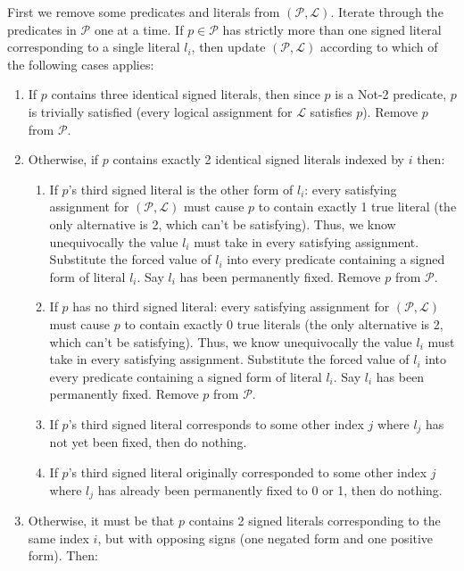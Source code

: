 \documentclass{article}
\begin{document}
First we remove some predicates and literals from $(\mathcal{P}, \mathcal{L})$. Iterate through the predicates in $\mathcal{P}$ one at a time.  If $p\in \mathcal{P}$ has strictly more than one signed literal corresponding to a single literal $l_i$, then update $(\mathcal{P}, \mathcal{L})$ according to which of the following cases applies:
\begin{enumerate}
\item If $p$ contains three identical signed literals, then since $p$ is a Not-2 predicate, $p$ is trivially satisfied (every logical assignment for $\mathcal{L}$ satisfies $p$). Remove $p$ from $\mathcal{P}$.
\item Otherwise, if $p$ contains exactly 2 identical signed literals indexed by $i$ then:
\begin{enumerate}
\item If $p$'s third signed literal is the other form of $l_i$: every satisfying assignment for $(\mathcal{P}, \mathcal{L})$ must cause $p$ to contain exactly 1 true literal (the only alternative is 2, which can't be satisfying). Thus, we know unequivocally the value $l_i$ must take in every satisfying assignment. Substitute the forced value of $l_i$ into every predicate containing a signed form of literal $l_i$. Say $l_i$ has been permanently fixed. Remove 
$p$ from $\mathcal{P}$. 
\item If $p$ has no third signed literal: every satisfying assignment for $(\mathcal{P}, \mathcal{L})$ must cause $p$ to contain exactly 0 true literals (the only alternative is 2, which can't be satisfying). Thus, we know unequivocally the value $l_i$ must take in every satisfying assignment. Substitute the forced value of $l_i$ into every predicate containing a signed form of literal $l_i$. Say $l_i$ has been permanently fixed. Remove 
$p$ from $\mathcal{P}$. 

\item If $p$'s third signed literal corresponds to some other index $j$ where $l_j$ has not yet been fixed, then do nothing.

\item If $p$'s third signed literal originally corresponded to some other index $j$ where $l_j$ has already been permanently fixed to 0 or 1, then do nothing. 

\end{enumerate}
\item Otherwise, it must be that $p$ contains 2 signed literals corresponding to the same index $i$, but with opposing signs (one negated form and one positive form).  Then:
\begin{enumerate}



\end{enumerate}
\end{enumerate}
\end{document}
